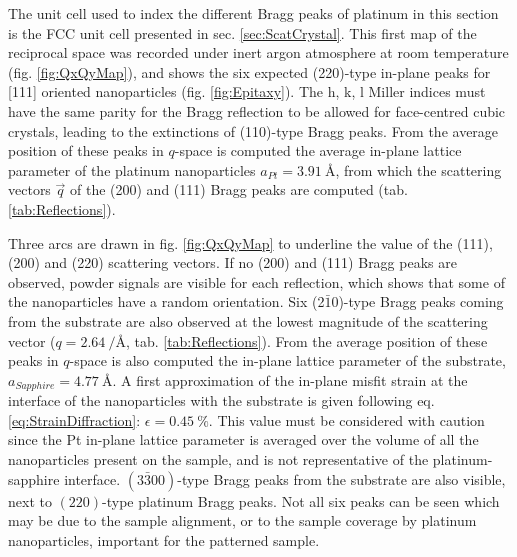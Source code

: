 The unit cell used to index the different Bragg peaks of platinum in this section is the FCC unit cell presented in sec. \ref{sec:ScatCrystal}.
This first map of the reciprocal space was recorded under inert argon atmosphere at room temperature (fig. \ref{fig:QxQyMap}), and shows the six expected (220)-type in-plane peaks for [111] oriented nanoparticles (fig. \ref{fig:Epitaxy}).
The h, k, l Miller indices must have the same parity for the Bragg reflection to be allowed for face-centred cubic crystals, leading to the extinctions of (110)-type Bragg peaks.
From the average position of these peaks in $q$-space is computed the average in-plane lattice parameter of the platinum nanoparticles $a_{Pt}=\qty{3.91}{\angstrom}$, from which the scattering vectors $\vec{q}$ of the (200) and (111) Bragg peaks are computed (tab. \ref{tab:Reflections}).

Three arcs are drawn in fig. \ref{fig:QxQyMap} to underline the value of the (111), (200) and (220) scattering vectors.
If no (200) and (111) Bragg peaks are observed, powder signals are visible for each reflection, which shows that some of the nanoparticles have a random orientation.
Six (2$\bar{1}$0)-type Bragg peaks coming from the  substrate are also observed at the lowest magnitude of the scattering vector ($q = \qty{2.64}{\per\angstrom}$, tab. \ref{tab:Reflections}).
From the average position of these peaks in $q$-space is also computed the in-plane lattice parameter of the substrate, $a_{Sapphire}=\qty{4.77}{\angstrom}$.
A first approximation of the in-plane misfit strain at the interface of the nanoparticles with the substrate is given following eq. \ref{eq:StrainDiffraction}: $\epsilon = \qty{0.45}{\percent}$.
This value must be considered with caution since the Pt in-plane lattice parameter is averaged over the volume of all the nanoparticles present on the sample, and is not representative of the platinum-sapphire interface.
$(3\bar{3}00)$-type Bragg peaks from the substrate are also visible, next to $(220)$-type platinum Bragg peaks.
Not all six peaks can be seen which may be due to the sample alignment, or to the sample coverage by platinum nanoparticles, important for the patterned sample.

